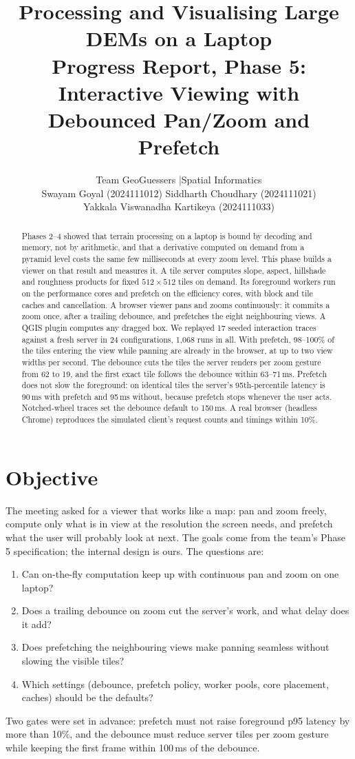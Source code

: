 \documentclass[11pt,a4paper]{article}
\title{\textbf{Processing and Visualising Large DEMs on a Laptop}\\[4pt]
\large Progress Report, Phase 5: Interactive Viewing with Debounced Pan/Zoom and Prefetch}
\author{Team GeoGuessers \quad|\quad Spatial Informatics\\[4pt]
Swayam Goyal (2024111012) \quad Siddharth Choudhary (2024111021)\\
Yakkala Viswanadha Kartikeya (2024111033)}
\date{}
\begin{document}
\maketitle

\begin{abstract}
\noindent
Phases 2--4 showed that terrain processing on a laptop is bound by decoding and memory, not by arithmetic, and that
a derivative computed on demand from a pyramid level costs the same few milliseconds at every zoom level. This
phase builds a viewer on that result and measures it. A tile server computes slope, aspect, hillshade and
roughness products for fixed $512\times512$ tiles on demand. Its foreground workers run on the performance cores
and prefetch on the efficiency cores, with block and tile caches and cancellation. A browser viewer pans and zooms
continuously: it commits a zoom once, after a trailing debounce, and prefetches the eight neighbouring views. A
QGIS plugin computes any dragged box. We replayed 17 seeded interaction traces against a fresh server in 24
configurations, 1{,}068 runs in all. With prefetch, 98--100\% of the tiles entering the view while panning are
already in the browser, at up to two view widths per second. The debounce cuts the tiles the server renders per
zoom gesture from 62 to 19, and the first exact tile follows the debounce within 63--71\,ms. Prefetch does not slow
the foreground: on identical tiles the server's 95th-percentile latency is 90\,ms with prefetch and 95\,ms without,
because prefetch stops whenever the user acts. Notched-wheel traces set the debounce default to 150\,ms. A real
browser (headless Chrome) reproduces the simulated client's request counts and timings within 10\%.
\end{abstract}

\section{Objective}
The meeting asked for a viewer that works like a map: pan and zoom freely, compute only what is in view at the
resolution the screen needs, and prefetch what the user will probably look at next. The goals come from the team's
Phase 5 specification; the internal design is ours. The questions are:
\begin{enumerate}
  \item Can on-the-fly computation keep up with continuous pan and zoom on one laptop?
  \item Does a trailing debounce on zoom cut the server's work, and what delay does it add?
  \item Does prefetching the neighbouring views make panning seamless without slowing the visible tiles?
  \item Which settings (debounce, prefetch policy, worker pools, core placement, caches) should be the defaults?
\end{enumerate}
Two gates were set in advance: prefetch must not raise foreground p95 latency by more than 10\%, and the debounce
must reduce server tiles per zoom gesture while keeping the first frame within 100\,ms of the debounce.
\end{document}

